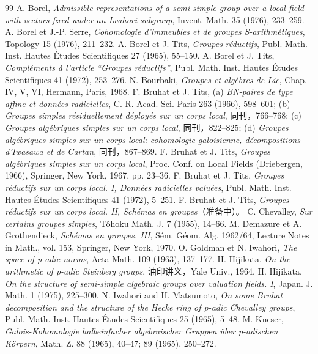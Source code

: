 \begin{thebibliography}{99}
 A. Borel, \emph{Admissible representations of a semi-simple group over a local field with vectors fixed under an Iwahori subgroup}, Invent. Math. 35 (1976), 233--259.
 A. Borel et J.-P. Serre, \emph{Cohomologie d'immeubles et de groupes S-arithmétiques}, Topology 15 (1976), 211--232.
 A. Borel et J. Tits, \emph{Groupes réductifs}, Publ. Math. Inst. Hautes Études Scientifiques 27 (1965), 55--150.
 A. Borel et J. Tits, \emph{Compléments à l'article ``Groupes réductifs''}, Publ. Math. Inst. Hautes Études Scientifiques 41 (1972), 253--276.
 N. Bourbaki, \emph{Groupes et algèbres de Lie}, Chap. IV, V, VI, Hermann, Paris, 1968.
 F. Bruhat et J. Tits, (a) \emph{BN-paires de type affine et données radicielles}, C. R. Acad. Sci. Paris 263 (1966), 598--601; (b) \emph{Groupes simples résiduellement déployés sur un corps local}, 同刊，766--768; (c) \emph{Groupes algébriques simples sur un corps local}, 同刊，822--825; (d) \emph{Groupes algébriques simples sur un corps local: cohomologie galoisienne, décompositions d'Iwasawa et de Cartan}, 同刊，867--869.
 F. Bruhat et J. Tits, \emph{Groupes algébriques simples sur un corps local}, Proc. Conf. on Local Fields (Driebergen, 1966), Springer, New York, 1967, pp. 23--36.
 F. Bruhat et J. Tits, \emph{Groupes réductifs sur un corps local. I, Données radicielles valuées}, Publ. Math. Inst. Hautes Études Scientifiques 41 (1972), 5--251.
 F. Bruhat et J. Tits, \emph{Groupes réductifs sur un corps local. II, Schémas en groupes}（准备中）。
 C. Chevalley, \emph{Sur certains groupes simples}, Tôhoku Math. J. 7 (1955), 14--66.
 M. Demazure et A. Grothendieck, \emph{Schémas en groupes. III}, Sém. Géom. Alg. 1962/64, Lecture Notes in Math., vol. 153, Springer, New York, 1970.
 O. Goldman et N. Iwahori, \emph{The space of p-adic norms}, Acta Math. 109 (1963), 137--177.
 H. Hijikata, \emph{On the arithmetic of p-adic Steinberg groups}, 油印讲义，Yale Univ., 1964.
 H. Hijikata, \emph{On the structure of semi-simple algebraic groups over valuation fields. I}, Japan. J. Math. 1 (1975), 225--300.
 N. Iwahori and H. Matsumoto, \emph{On some Bruhat decomposition and the structure of the Hecke ring of p-adic Chevalley groups}, Publ. Math. Inst. Hautes Études Scientifiques 25 (1965), 5--48.
 M. Kneser, \emph{Galois-Kohomologie halbeinfacher algebraischer Gruppen über p-adischen Körpern}, Math. Z. 88 (1965), 40--47; 89 (1965), 250--272.

\end{thebibliography}

